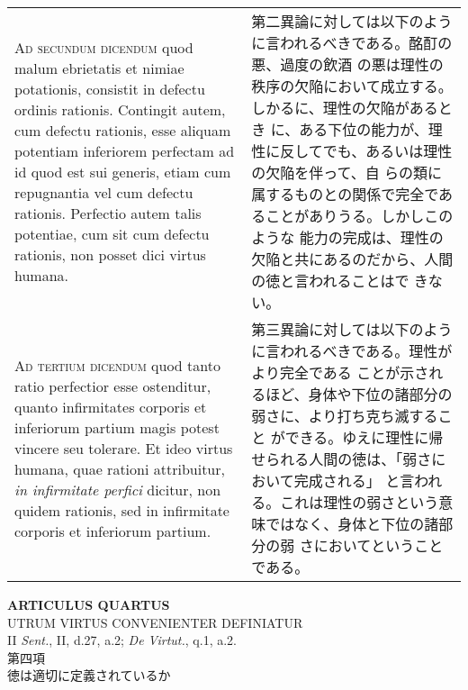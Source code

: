 \documentclass[10pt]{jsarticle}
\begin{document}
\begin{longtable}{p{21em}p{21em}}
\\

{\scshape Ad secundum dicendum} quod malum ebrietatis et nimiae
potationis, consistit in defectu ordinis rationis. Contingit autem,
cum defectu rationis, esse aliquam potentiam inferiorem perfectam ad
id quod est sui generis, etiam cum repugnantia vel cum defectu
rationis. Perfectio autem talis potentiae, cum sit cum defectu
rationis, non posset dici virtus humana.

&

第二異論に対しては以下のように言われるべきである。酩酊の悪、過度の飲酒
の悪は理性の秩序の欠陥において成立する。しかるに、理性の欠陥があるとき
に、ある下位の能力が、理性に反してでも、あるいは理性の欠陥を伴って、自
らの類に属するものとの関係で完全であることがありうる。しかしこのような
能力の完成は、理性の欠陥と共にあるのだから、人間の徳と言われることはで
きない。

\\

{\scshape Ad tertium dicendum} quod tanto ratio perfectior esse
ostenditur, quanto infirmitates corporis et inferiorum partium magis
potest vincere seu tolerare. Et ideo virtus humana, quae rationi
attribuitur, {\itshape in infirmitate perfici} dicitur, non quidem
rationis, sed in infirmitate corporis et inferiorum partium.

&

第三異論に対しては以下のように言われるべきである。理性がより完全である
ことが示されるほど、身体や下位の諸部分の弱さに、より打ち克ち滅すること
ができる。ゆえに理性に帰せられる人間の徳は、「弱さにおいて完成される」
と言われる。これは理性の弱さという意味ではなく、身体と下位の諸部分の弱
さにおいてということである。

\end{longtable}
\newpage

\begin{center}
{\Large {\bf ARTICULUS QUARTUS}}\\
{\large UTRUM VIRTUS CONVENIENTER DEFINIATUR}\\
{\footnotesize II {\itshape Sent.}, II, d.27, a.2; {\itshape De Virtut.}, q.1, a.2.}\\
{\Large 第四項\\徳は適切に定義されているか}
\end{center}
\end{document}
